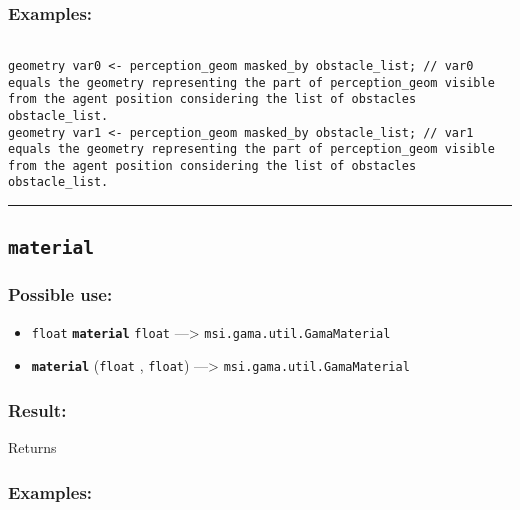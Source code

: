 \documentclass[]{book}
\providecommand{\tightlist}{%
  \setlength{\itemsep}{0pt}\setlength{\parskip}{0pt}}
\theoremstyle{definition}
\theoremstyle{definition}
\theoremstyle{definition}
\theoremstyle{remark}
\begin{document}
\subsubsection{Examples:}\label{examples-231}

\begin{verbatim}
 
geometry var0 <- perception_geom masked_by obstacle_list; // var0 equals the geometry representing the part of perception_geom visible from the agent position considering the list of obstacles obstacle_list. 
geometry var1 <- perception_geom masked_by obstacle_list; // var1 equals the geometry representing the part of perception_geom visible from the agent position considering the list of obstacles obstacle_list.
\end{verbatim}

\begin{center}\rule{0.5\linewidth}{\linethickness}\end{center}

\subsection{\texorpdfstring{\texttt{material}}{material}}\label{material-4}

\subsubsection{Possible use:}\label{possible-use-335}

\begin{itemize}
\tightlist
\item
  \texttt{float} \textbf{\texttt{material}} \texttt{float}
  ---\textgreater{} \texttt{msi.gama.util.GamaMaterial}
\item
  \textbf{\texttt{material}} (\texttt{float} , \texttt{float})
  ---\textgreater{} \texttt{msi.gama.util.GamaMaterial}
\end{itemize}

\subsubsection{Result:}\label{result-324}

Returns

\subsubsection{Examples:}\label{examples-232}
\end{document}
